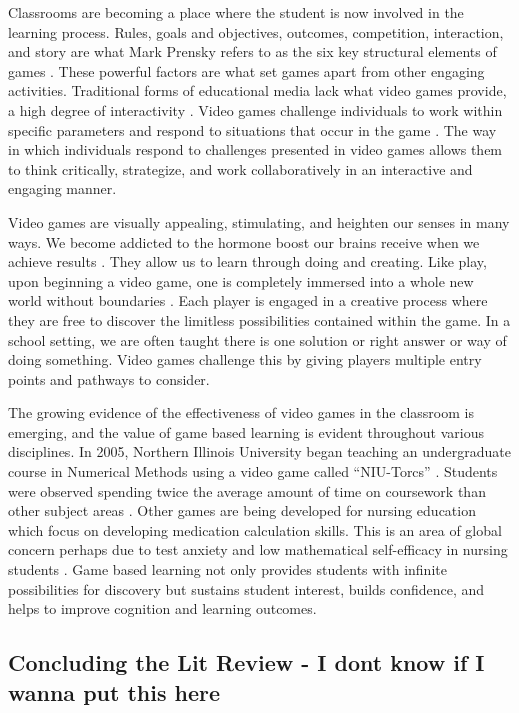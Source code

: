 \documentclass{article}
\begin{document}
Classrooms are becoming a place where the student is now involved in the learning process. Rules, goals and objectives, outcomes, competition, interaction, and story are what Mark Prensky refers to as the six key structural elements of games \citep{prensky2001fun}. These powerful factors are what set games apart from other engaging activities. Traditional forms of educational media lack what video games provide, a high degree of interactivity \citep{coller2009effectiveness}. Video games challenge individuals to work within specific parameters and respond to situations that occur in the game \citep{coller2009effectiveness}. The way in which individuals respond to challenges presented in video games allows them to think critically, strategize, and work collaboratively in an interactive and engaging manner.

Video games are visually appealing, stimulating, and heighten our senses in many ways. We become addicted to the hormone boost our brains receive when we achieve results \citep{tomavska2022let}. They allow us to learn through doing and creating. Like play, upon beginning a video game, one is completely immersed into a whole new world without boundaries \citep{coller2009effectiveness}. Each player is engaged in a creative process where they are free to discover the limitless possibilities contained within the game. In a school setting, we are often taught there is one solution or right answer or way of doing something. Video games challenge this by giving players multiple entry points and pathways to consider.

The growing evidence of the effectiveness of video games in the classroom is emerging, and the value of game based learning is evident throughout various disciplines. In 2005, Northern Illinois University began teaching an undergraduate course in Numerical Methods using a video game called “NIU-Torcs” \citep{coller2009effectiveness}. Students were observed spending twice the average amount of time on coursework than other subject areas \citep{coller2009effectiveness}. Other games are being developed for nursing education which focus on developing medication calculation skills. This is an area of global concern perhaps due to test anxiety and low mathematical self-efficacy in nursing students \citep{foss2013medication}.  Game based learning not only provides students with infinite possibilities for discovery but sustains student interest, builds confidence, and helps to improve cognition and learning outcomes.


\subsection{Concluding the Lit Review - I dont know if I wanna put this here}
\end{document}
